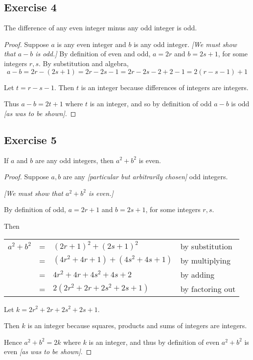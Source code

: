 \documentclass[14pt]{extarticle}
\begin{document}
\subsection{Exercise 4}
The difference of any even integer minus any odd integer is odd.

\begin{proof}
Suppose $a$ is any even integer and $b$ is any odd integer. 
{\it [We must show that $a - b$ is odd.]} By definition of even and odd, $a = 2r$ and $b = 2s + 1$, for some integers $r, s$. By substitution and algebra,
$$
a-b = 2r - (2s+1) = 2r-2s-1 = 2r-2s-2+2-1 = 2(r-s-1)+1
$$


Let $t = r-s-1$. Then $t$ is an integer because differences of integers are integers. 

Thus $a-b = 2t+1$ where $t$ is an integer, and so by definition of odd $a-b$ is odd {\it [as was to be shown]}.
\end{proof}

\subsection{Exercise 5}
If $a$ and $b$ are any odd integers, then $a^2 + b^2$ is even.

\begin{proof}
Suppose $a,b$ are any {\it [particular but arbitrarily chosen]} odd integers. 

{\it [We must show that $a^2+b^2$ is even.]}

By definition of odd, $a = 2r+1$ and $b = 2s+1$, for some integers $r,s$. 

Then

\begin{center}
\begin{tabular}{rcll}
$a^2+b^2$ & = & $(2r+1)^2 + (2s+1)^2$ & \color{cyan} by substitution \\
& = & $(4r^2 + 4r + 1) + (4s^2 + 4s + 1)$ & \color{cyan} by multiplying \\
& = & $4r^2 + 4r + 4s^2 + 4s + 2$ & \color{cyan} by adding \\
& = & $2(2r^2+2r+2s^2+2s+1)$ & \color{cyan} by factoring out \\
\end{tabular}
\end{center}

Let $k = 2r^2+2r+2s^2+2s+1$. 

Then $k$ is an integer because squares, products and sums of integers are integers. 

Hence $a^2+b^2 = 2k$ where $k$ is an integer, and thus by definition of even $a^2+b^2$ is even {\it [as was to be shown]}.
\end{proof}
\end{document}
